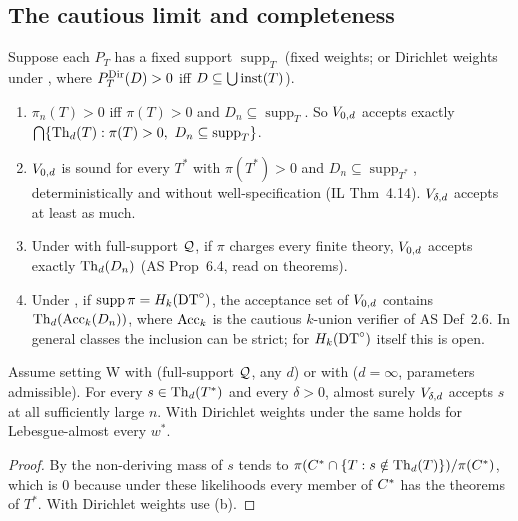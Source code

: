 \subsection{The cautious limit and completeness}\label{sec:sound:cautious}

\begin{proposition}\label{prop:sound:cautious}
Suppose each $P_T$ has a fixed support $\operatorname{supp}_T$ (fixed weights; or Dirichlet weights under \Lzero, where $P^{\mathrm{Dir}}_{T}(D)>0$ iff $D\subseteq\bigcup\mathrm{inst}(T)$).
\begin{enumerate}[label=(\alph*)]
\item $\pi_n(T)>0$ iff $\pi(T)>0$ and $D_n\subseteq\operatorname{supp}_T$. So $V_{0,d}$ accepts exactly $\bigcap\{\Th_d(T):\pi(T)>0,\ D_n\subseteq\operatorname{supp}_T\}$.
\item $V_{0,d}$ is sound for every $T^*$ with $\pi(T^*)>0$ and $D_n\subseteq\operatorname{supp}_{T^*}$, deterministically and without well-specification (IL Thm~4.14). $V_{\delta,d}$ accepts at least as much.
\item Under \Lzero{} with full-support $\mathcal{Q}$, if $\pi$ charges every finite theory, $V_{0,d}$ accepts exactly $\mathrm{Th}_d(D_n)$ (AS Prop~6.4, read on theorems).
\item Under \Lzero, if $\operatorname{supp}\pi=H_{k}(\mathrm{DT}^{\circ})$, the acceptance set of $V_{0,d}$ contains $\mathrm{Th}_d(\mathrm{Acc}_k(D_n))$, where $\mathrm{Acc}_k$ is the cautious $k$-union verifier of AS Def~2.6. In general classes the inclusion can be strict; for $H_{k}(\mathrm{DT}^{\circ})$ itself this is open.
\end{enumerate}
\end{proposition}

\begin{proposition}\label{prop:sound:complete}
Assume setting W with \Lzero{} (full-support $\mathcal{Q}$, any $d$) or with \Lone{} ($d=\infty$, parameters admissible). For every $s\in\mathrm{Th}_d(T^*)$ and every $\delta>0$, almost surely $V_{\delta,d}$ accepts $s$ at all sufficiently large $n$. With Dirichlet weights under \Lzero{} the same holds for Lebesgue-almost every $w^*$.
\end{proposition}

\begin{proof}
By  the non-deriving mass of $s$ tends to $\pi(C^{*}\cap\{T:s\notin\mathrm{Th}_d(T)\})/\pi(C^{*})$, which is $0$ because under these likelihoods every member of $C^{*}$ has the theorems of $T^*$. With Dirichlet weights use (b).
\end{proof}

